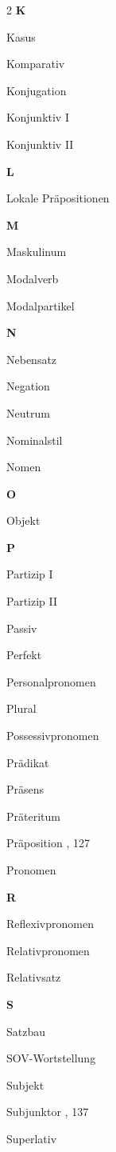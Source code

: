 \begin{center}
\begin{multicols}{2}
\textbf{K}
\item Kasus  
\item Komparativ  
\item Konjugation  
\item Konjunktiv I  
\item Konjunktiv II  

\textbf{L}
\item Lokale Präpositionen  

\textbf{M}
\item Maskulinum  
\item Modalverb  
\item Modalpartikel  

\textbf{N}
\item Nebensatz  
\item Negation  
\item Neutrum  
\item Nominalstil  
\item Nomen  

\textbf{O}
\item Objekt  

\textbf{P}
\item Partizip I  
\item Partizip II  
\item Passiv  
\item Perfekt  
\item Personalpronomen  
\item Plural  
\item Possessivpronomen  
\item Prädikat  
\item Präsens  
\item Präteritum  
\item Präposition  , 127
\item Pronomen  

\textbf{R}
\item Reflexivpronomen  
\item Relativpronomen  
\item Relativsatz  

\textbf{S}
\item Satzbau  
\item SOV-Wortstellung  
\item Subjekt  
\item Subjunktor  , 137
\item Superlativ  


\end{multicols}
\end{center}
